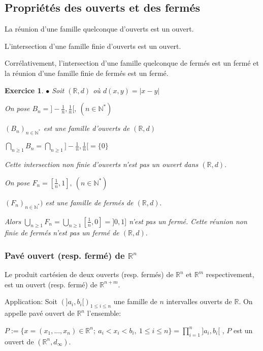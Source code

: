 \documentclass[11pt,a4paper]{report}
\newtheorem{exo}{Exercice}[section]
\begin{document}
\subsection{Propriétés des ouverts et des fermés}

La réunion d'une famille quelconque d'ouverts est un ouvert.

L'intersection d'une famille finie d'ouverts est un ouvert.

Corrélativement, l'intersection d'une famille quelconque de fermés est un fermé et la réunion d'une famille finie de fermés est un fermé.

\begin{exo}

$\bullet$ Soit $(\mathbb{R},d)$ où $d(x,y)=|x-y|$

On pose $B_n=]-\frac{1}{n},\frac{1}{n}[,\:(n\in \mathbb{N}^{*})$

$(B_n)_{n\in \mathbb{N}^{*}}$ est une famille d'ouverts de $(\mathbb{R},d)$

$\bigcap_{n\geq1}B_n=\bigcap_{n\geq1}]-\frac{1}{n},\frac{1}{n}[=\{0\}$

Cette intersection non finie d'ouverts n'est pas un ouvert dans $(\mathbb{R},d).$

On pose $F_n=[\frac{1}{n},1],\:(n\in \mathbb{N}^{*})$

$(F_n)_{n\in \mathbb{N}^{*}})$ est une famille de fermés de $(\mathbb{R},d).$

Alors $\bigcup_{n\geq1}F_n=\bigcup_{n\geq1}[\frac{1}{n},0]=]0,1]$ n'est pas un fermé. Cette réunion non finie de fermés n'est pas un fermé de $(\mathbb{R},d).$

\end{exo}


\subsubsection{Pavé ouvert (resp. fermé) de $\mathbb{R}^n$}

Le produit cartésien de deux ouverts (resp. fermés) de $\mathbb{R}^n$ et $\mathbb{R}^m$ respectivement, est un ouvert (resp. fermé) de $\mathbb{R}^{n+m}.$

Application: Soit $(]a_i,b_i[)_{1\leq i\leq n}$ une famille de $n$ intervalles ouverts de $\mathbb{R}.$ On appelle pavé ouvert de $\mathbb{R}^n$ l'ensemble:

$P:=\{x=(x_1,...,x_n)\in \mathbb{R}^n;\:a_i<x_i<b_i,\:1\leq i\leq n\}=\prod_{i=1}^{n}]a_i,b_i[$ , $P$ est un ouvert de $(\mathbb{R}^n,d_{\infty}).$
\end{document}
